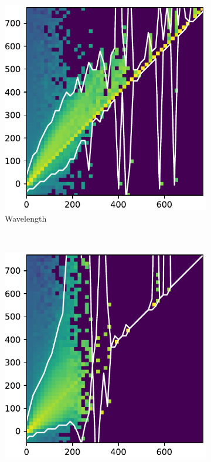 \documentclass[10pt,letterpaper]{article}
\begin{document}
				\begin{figure}[h!]
					\centering
					\begin{subfigure}[t]{0.288\textwidth}
						\centering
						\includegraphics[width=\textwidth]{fig/hist_0}
						\caption{Wavelength}
					\end{subfigure}
					~ 
					\begin{subfigure}[t]{0.288\textwidth}
						\centering
						\includegraphics[width=\textwidth]{fig/hist_1}

\end{subfigure}
\end{figure}
\end{document}
